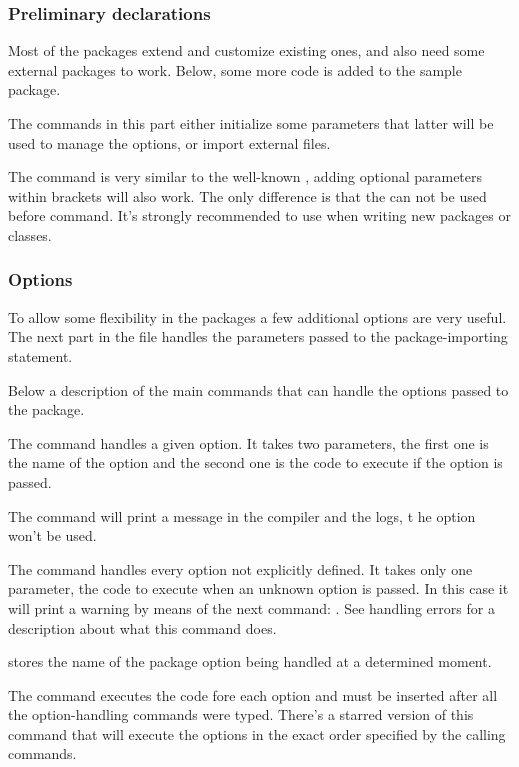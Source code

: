 \subsubsection{Preliminary declarations}

Most of the packages extend and customize existing ones, 
and also need some external packages to work. Below, 
some more code is added to the sample package.

The commands in this part either initialize some parameters 
that latter will be used to manage the options, 
or import external files.

The command  is very similar to the 
well-known , adding optional parameters 
within brackets will also work. The only difference is that 
the  can not be used before 
 command. It's strongly recommended 
to use  when writing new packages or 
classes.

\subsubsection{Options}

To allow some flexibility in the packages a few additional 
options are very useful. The next part in the file handles 
the parameters passed to the package-importing statement.

Below a description of the main commands that can handle the options passed to the package.

The command  handles a given option. It takes two parameters, 
the first one is the name of the option and the second one is the code to execute if the 
option is passed.

The command  will print a message in the compiler and the logs, t
he option won't be used.

The command  handles every option not explicitly defined. 
It takes only one parameter, the code to execute when an unknown option is passed. 
In this case it will print a warning by means of the next command:
. See handling errors for a description about what this command does.

 stores the name of the package option being handled at a determined moment.

The command  executes the code fore each option and must be 
inserted after all the option-handling commands were typed. 
There's a starred version of this command that will execute 
the options in the exact order specified by the calling commands.

